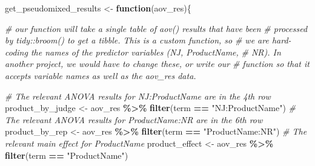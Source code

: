 \documentclass[
]{book}
\newenvironment{Shaded}{\begin{snugshade}}{\end{snugshade}}
\newcommand{\CommentTok}[1]{\textcolor[rgb]{0.56,0.35,0.01}{\textit{#1}}}
\newcommand{\ControlFlowTok}[1]{\textcolor[rgb]{0.13,0.29,0.53}{\textbf{#1}}}
\newcommand{\FunctionTok}[1]{\textcolor[rgb]{0.13,0.29,0.53}{\textbf{#1}}}
\newcommand{\NormalTok}[1]{#1}
\newcommand{\OtherTok}[1]{\textcolor[rgb]{0.56,0.35,0.01}{#1}}
\newcommand{\SpecialCharTok}[1]{\textcolor[rgb]{0.81,0.36,0.00}{\textbf{#1}}}
\newcommand{\StringTok}[1]{\textcolor[rgb]{0.31,0.60,0.02}{#1}}
\begin{document}
\begin{Shaded}
\begin{Highlighting}[]
\NormalTok{get\_pseudomixed\_results }\OtherTok{\textless{}{-}} \ControlFlowTok{function}\NormalTok{(aov\_res)\{}
  
  \CommentTok{\# our function will take a single table of aov() results that have been}
  \CommentTok{\# processed by tidy::broom() to get a tibble.  This is a custom function, so}
  \CommentTok{\# we are hard{-}coding the names of the predictor variables (NJ, ProductName,}
  \CommentTok{\# NR).  In another project, we would have to change these, or write our}
  \CommentTok{\# function so that it accepts variable names as well as the aov\_res data.}
  
  \CommentTok{\# The relevant ANOVA results for NJ:ProductName are in the 4th row}
\NormalTok{  product\_by\_judge }\OtherTok{\textless{}{-}}\NormalTok{ aov\_res }\SpecialCharTok{\%\textgreater{}\%} \FunctionTok{filter}\NormalTok{(term }\SpecialCharTok{==} \StringTok{"NJ:ProductName"}\NormalTok{)}
  \CommentTok{\# The relevant ANOVA results for ProductName:NR are in the 6th row}
\NormalTok{  product\_by\_rep }\OtherTok{\textless{}{-}}\NormalTok{ aov\_res }\SpecialCharTok{\%\textgreater{}\%} \FunctionTok{filter}\NormalTok{(term }\SpecialCharTok{==} \StringTok{"ProductName:NR"}\NormalTok{)}
  \CommentTok{\# The relevant main effect for ProductName}
\NormalTok{  product\_effect }\OtherTok{\textless{}{-}}\NormalTok{ aov\_res }\SpecialCharTok{\%\textgreater{}\%} \FunctionTok{filter}\NormalTok{(term }\SpecialCharTok{==} \StringTok{"ProductName"}\NormalTok{)}
  

\end{Highlighting}
\end{Shaded}
\end{document}
